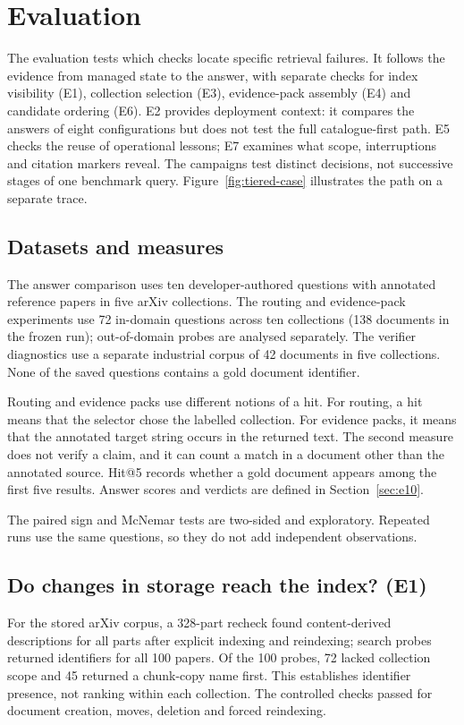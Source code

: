 \section{Evaluation}
\label{sec:eval}
The evaluation tests which checks locate specific retrieval failures.
It follows the evidence from managed state to the answer, with separate
checks for index visibility (E1), collection selection (E3), evidence-pack
assembly (E4) and candidate ordering (E6). E2 provides deployment context:
it compares the answers of eight configurations but does not test
the full catalogue-first path. E5 checks the reuse of operational lessons;
E7 examines what scope, interruptions and citation markers reveal. The
campaigns test distinct decisions, not successive stages of one benchmark
query. Figure~\ref{fig:tiered-case} illustrates the path on a separate trace.

\subsection{Datasets and measures}\label{sec:eval-setup}
The answer comparison uses ten developer-authored questions with annotated
reference papers in five arXiv collections. The routing and evidence-pack
experiments use 72 in-domain questions across ten collections (138 documents
in the frozen run); out-of-domain probes are analysed separately. The
verifier diagnostics use a separate industrial corpus of 42 documents in
five collections. None of the saved questions contains a gold document
identifier.

Routing and evidence packs use different notions of a hit. For routing, a
hit means that the selector chose the labelled collection. For evidence
packs, it means that the annotated target string occurs in the returned text.
The second measure does not verify a claim, and it can count a match in a
document other than the annotated source. Hit@5 records whether a gold
document appears among the first five results. Answer scores and verdicts
are defined in Section~\ref{sec:e10}.

The paired sign and McNemar tests are two-sided and exploratory. Repeated
runs use the same questions, so they do not add independent observations.

\subsection{Do changes in storage reach the index? (E1)}
\label{sec:e1}
\label{sec:e2}
\label{sec:exp-e1}
For the stored arXiv corpus, a 328-part recheck found content-derived
descriptions for all parts after explicit indexing and reindexing; search
probes returned identifiers for all 100 papers. Of the 100
probes, 72 lacked collection scope and 45 returned a chunk-copy name first.
This establishes identifier presence, not ranking within each collection. The controlled
checks passed for document creation, moves, deletion and forced reindexing.

